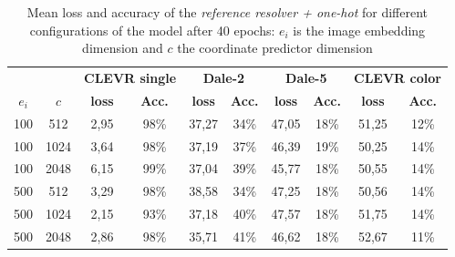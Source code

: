 \begin{table}[b]
    \centering
    \begin{tabular}{cc|cc|cc|cc|cc}
        \toprule
              &        & \multicolumn{2}{c}{\textbf{CLEVR single}} & \multicolumn{2}{c}{\textbf{Dale-2}} & \multicolumn{2}{c}{\textbf{Dale-5}} & \multicolumn{2}{c}{\textbf{CLEVR color}}                                                                 \\  \cmidrule(lr){3-4}\cmidrule(lr){5-6}\cmidrule(lr){7-8}\cmidrule(lr){9-10}
        $e_i$ & $c$    & \textbf{loss}                             & \textbf{Acc.}                       & \textbf{loss}                       & \textbf{Acc.}                            & \textbf{loss} & \textbf{Acc.} & \textbf{loss} & \textbf{Acc.} \\\midrule
        {100} & {512}  & {2,95}                                    & {98\%}                              & {37,27}                             & {34\%}                                   & {47,05}       & {18\%}        & {51,25}       & {12\%}        \\
        {100} & {1024} & {3,64}                                    & {98\%}                              & {37,19}                             & {37\%}                                   & {46,39}       & {19\%}        & {50,25}       & {14\%}        \\
        {100} & {2048} & {6,15}                                    & {99\%}                              & {37,04}                             & {39\%}                                   & {45,77}       & {18\%}        & {50,55}       & {14\%}        \\
        {500} & {512}  & {3,29}                                    & {98\%}                              & {38,58}                             & {34\%}                                   & {47,25}       & {18\%}        & {50,56}       & {14\%}        \\
        {500} & {1024} & {2,15}                                    & {93\%}                              & {37,18}                             & {40\%}                                   & {47,57}       & {18\%}        & {51,75}       & {14\%}        \\
        {500} & {2048} & {2,86}                                    & {98\%}                              & {35,71}                             & {41\%}                                   & {46,62}       & {18\%}        & {52,67}       & {11\%}        \\
        \bottomrule
    \end{tabular}
    \caption{Mean loss and accuracy of the \emph{reference resolver + one-hot} for different configurations of the model after 40 epochs: $e_i$ is the image embedding dimension and $c$ the coordinate predictor dimension}
    \label{tab:results:reference-resolver-one-hot}
\end{table}

